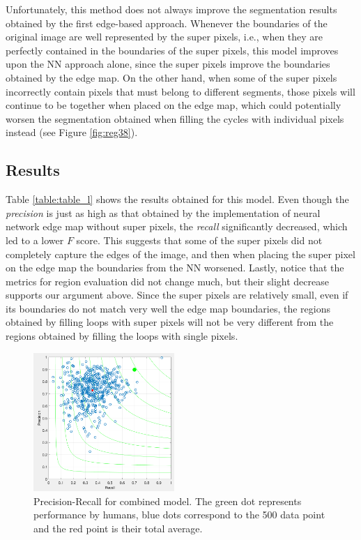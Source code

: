 \documentclass[10pt, twocolumn, twoside]{article}
\newcommand{\squeezeup}{\vspace{-2.5mm}}
\begin{document}
Unfortunately, this method does not always improve the segmentation results obtained by the first edge-based approach. Whenever the boundaries of the original image are well represented by the super pixels, i.e., when they are perfectly contained in the boundaries of the super pixels, this model improves upon the NN approach alone, since the super pixels improve the boundaries obtained by the edge map. On the other hand, when some of the super pixels incorrectly contain pixels that must belong to different segments, those pixels will continue to be together when placed on the edge map, which could potentially worsen the segmentation obtained when filling the cycles with individual pixels instead (see Figure \ref{fig:reg38}).


\subsection{Results}
 
Table \ref{table:table_l} shows the results obtained for this model. Even though the \textit{precision} is just as high as that obtained by the implementation of neural network edge map without super pixels, the \textit{recall} significantly decreased, which led to a lower $F$ score. This suggests that some of the super pixels did not completely capture the edges of the image, and then when placing the super pixel on the edge map the boundaries from the NN worsened. Lastly, notice that the metrics for region evaluation did not change much, but their slight decrease supports our argument above. Since the super pixels are relatively small, even if its boundaries do not match very well the edge map boundaries, the regions obtained by filling loops with super pixels will not be very different from the regions obtained by filling the loops with single pixels.


\begin{figure}[h]
\squeezeup
\squeezeup
\squeezeup
	\centering
	\includegraphics[width=2.1in]{images/F-mix.png}
    \caption{Precision-Recall for combined model. The green dot represents performance by humans, blue dots correspond to the 500 data point and the red point is their total average.}
    \label{fig:Fmix}
\end{figure}
\end{document}
